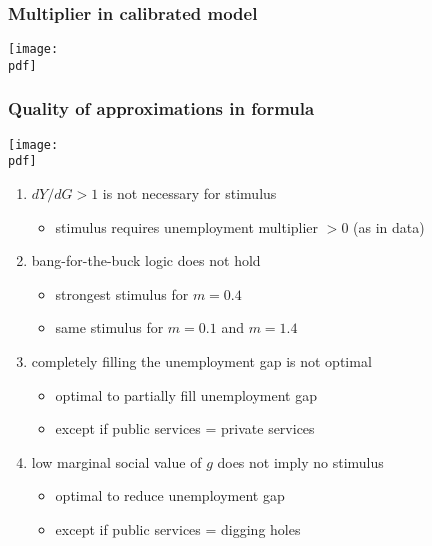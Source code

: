 \documentclass[12pt,xcolor={dvipsnames},hyperref={pdftex,pdfpagemode=UseNone,hidelinks,pdfdisplaydoctitle=true},usepdftitle=false]{beamer}
\def\pdf{xstimulus.pdf}
\begin{document}
\begin{frame}
\frametitle{Multiplier in calibrated model}
\texttt{[image: \\pdf]}%
\end{frame}

\begin{frame}
\frametitle{Quality of approximations in formula}
\texttt{[image: \\pdf]}%
\end{frame}

\begin{frame}
\end{frame}

\begin{frame}
\begin{enumerate}
\item  $dY/dG>1$ is not necessary for stimulus
\begin{itemize}
\item stimulus requires unemployment multiplier $>0$ (as in data)
\end{itemize}
\item bang-for-the-buck logic does not hold
\begin{itemize}
\item strongest stimulus for $m=0.4$
\item same stimulus for $m=0.1$ and $m=1.4$
\end{itemize}
\item completely filling the unemployment gap is not optimal
\begin{itemize}
\item optimal to partially fill unemployment gap 
\item except if public services = private services
\end{itemize}
\item low marginal social value of $g$ does not imply no stimulus
\begin{itemize}
\item optimal to reduce unemployment gap 
\item except if public services = digging holes
\end{itemize}
\end{enumerate}
\end{frame}
\end{document}
